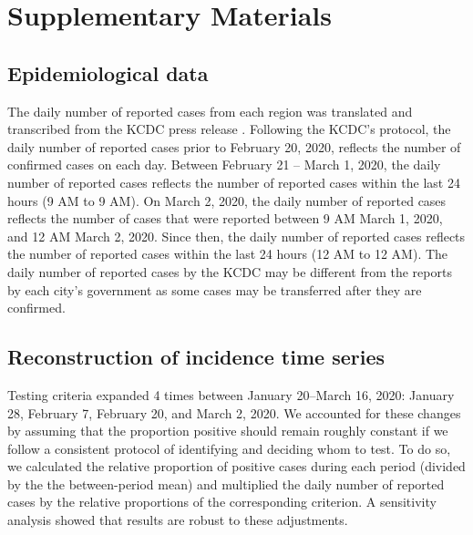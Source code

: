 \renewcommand\thefigure{S\arabic{figure}}
\setcounter{figure}{0}    

\section*{Supplementary Materials}

\subsection*{Epidemiological data}

The daily number of reported cases from each region was translated and transcribed from the KCDC press release \citep{kcdc}.
Following the KCDC's protocol, the daily number of reported cases prior to February 20, 2020, reflects the number of confirmed cases on each day.
Between February 21 -- March 1, 2020, the daily number of reported cases reflects the number of reported cases within the last 24 hours (9 AM to 9 AM).
On March 2, 2020, the daily number of reported cases reflects the number of cases that were reported between 9 AM March 1, 2020, and 12 AM March 2, 2020.
Since then, the daily number of reported cases reflects the number of reported cases within the last 24 hours (12 AM to 12 AM).
The daily number of reported cases by the KCDC may be different from the reports by each city's government as some cases may be transferred after they are confirmed.

\subsection*{Reconstruction of incidence time series}

Testing criteria expanded 4 times between January 20--March 16, 2020: January 28, February 7, February 20, and March 2, 2020.
We accounted for these changes by assuming that the proportion positive should remain roughly constant if we follow a consistent protocol of identifying and deciding whom to test.
To do so, we calculated the relative proportion of positive cases during each period (divided by the the between-period mean) and multiplied the daily number of reported cases by the relative proportions of the corresponding criterion.
A sensitivity analysis showed that results are robust to these adjustments.

